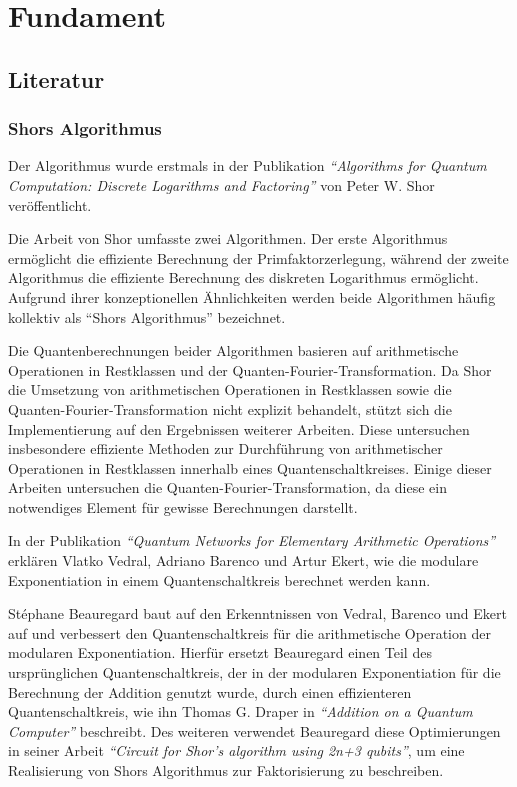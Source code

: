 \section{Fundament}
\subsection{Literatur} 
\subsubsection*{Shors Algorithmus}
Der Algorithmus wurde erstmals in der Publikation \textit{"`Algorithms for Quantum Computation: Discrete Logarithms and Factoring"'} von Peter W. Shor veröffentlicht.

Die Arbeit von Shor umfasste zwei Algorithmen.
Der erste Algorithmus ermöglicht die effiziente Berechnung der Primfaktorzerlegung, 
während der zweite Algorithmus die effiziente Berechnung des diskreten Logarithmus ermöglicht.
Aufgrund ihrer konzeptionellen Ähnlichkeiten werden beide Algorithmen häufig kollektiv als "`Shors Algorithmus"' bezeichnet.

Die Quantenberechnungen beider Algorithmen basieren auf arithmetische Operationen in Restklassen und der Quanten-Fourier-Transformation.
Da Shor die Umsetzung von arithmetischen Operationen in Restklassen sowie die Quanten-Fourier-Transformation nicht explizit behandelt,
stützt sich die Implementierung auf den Ergebnissen weiterer Arbeiten. 
Diese untersuchen insbesondere effiziente Methoden zur Durchführung von arithmetischer Operationen in Restklassen innerhalb eines Quantenschaltkreises.
Einige dieser Arbeiten untersuchen die Quanten-Fourier-Transformation, 
da diese ein notwendiges Element für gewisse Berechnungen darstellt.

In der Publikation \textit{"`Quantum Networks for Elementary Arithmetic Operations"'} erklären Vlatko Vedral,  Adriano Barenco und Artur Ekert,
wie die modulare Exponentiation in einem Quantenschaltkreis berechnet werden kann. 

St\'{e}phane Beauregard baut auf den Erkenntnissen von Vedral, Barenco und Ekert auf und
verbessert den Quantenschaltkreis für die arithmetische Operation der modularen Exponentiation.
Hierfür ersetzt Beauregard einen Teil des ursprünglichen Quantenschaltkreis,
der in der modularen Exponentiation für die Berechnung der Addition genutzt wurde, 
durch einen effizienteren Quantenschaltkreis,
wie ihn Thomas G. Draper in \textit{"`Addition on a Quantum Computer"'} beschreibt.
Des weiteren verwendet Beauregard diese Optimierungen in seiner Arbeit \textit{"`Circuit for Shor’s algorithm using 2n+3 qubits"'},
um eine Realisierung von Shors Algorithmus zur Faktorisierung zu beschreiben.

